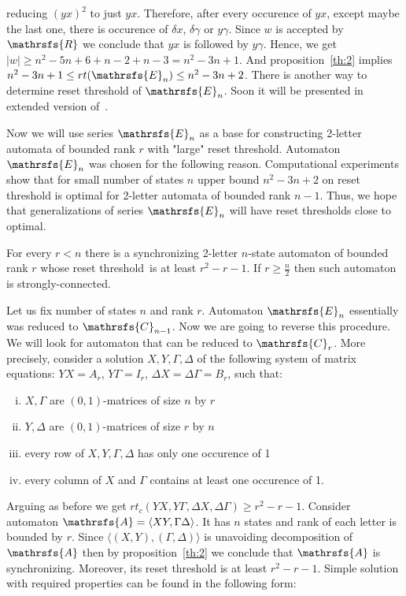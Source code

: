 \documentclass[11pt]{llncs}
\newcommand{\rl}{reset threshold}
\newcommand{\A}{\mathrsfs{A}}
\newcommand{\R}{\mathrsfs{R}}
\newcommand{\G}{\Gamma}
\newcommand{\D}{\Delta}
\newcommand{\g}{\gamma}
\newcommand{\dl}{\delta}
\newcommand{\rt}{rt}
\newcommand{\rtc}{rt_{c}}
\begin{document}
reducing $(yx)^2$ to just $yx$. Therefore, after every occurence of $yx$, except maybe the last one, there is occurence 
of $\dl x$, $\dl \g$ or $y \g$. Since $w$ is accepted by $\R$ we conclude that $yx$ is followed by $y\g$.
Hence, we get $|w| \geq n^2 - 5n + 6 + n - 2 + n - 3 = n^2 -3n + 1$.
And proposition~\ref{th:2} implies $n^2 -3n + 1 \leq \rt(\mathrsfs{E}_n) \leq n^2 -3n + 2$. 
There is another way to determine reset threshold of $\mathrsfs{E}_n$. Soon it will be presented in
extended version of~\cite{AGV}.

Now we will use series $\mathrsfs{E}_n$ as a base for constructing 2-letter automata of bounded
rank $r$ with "large" reset threshold. Automaton $\mathrsfs{E}_n$ was chosen for the following reason.
Computational experiments show that for small number of states $n$ upper bound $n^2 -3n +2$ on reset threshold is optimal
for 2-letter automata of bounded rank $n - 1$.
Thus, we hope that generalizations of series $\mathrsfs{E}_n$ will have reset thresholds close to optimal.

\begin{proposition}
For every $r < n$ there is a synchronizing 2-letter $n$-state automaton of bounded rank $r$ whose \rl\ is at least 
$r^2 -r - 1$. If $r \geq \frac{n}{2}$ then such automaton is strongly-connected.
\end{proposition}

Let us fix number of states $n$ and rank $r$. Automaton $\mathrsfs{E}_n$ essentially was reduced to $\mathrsfs{C}_{n - 1}$.
Now we are going to reverse this procedure. We will look for automaton that can be reduced to $\mathrsfs{C}_r$.
More precisely, consider a solution $X,Y,\G,\D$ of the following system of matrix equations:
$YX = A_{r}$, $Y\G = I_{r}$, $\D X = \D \G = B_{r}$, such that:
\begin{enumerate}[(i)]
\item $X,\G$ are $(0,1)$-matrices of size $n$ by $r$
\item $Y,\D$ are $(0,1)$-matrices of size $r$ by $n$
\item every row of $X, Y, \G, \D$ has only one occurence of 1
\item every column of $X$ and $\G$ contains at least one occurence of 1.
\end{enumerate}
Arguing as before we get $\rtc(YX, Y\G, \D X, \D \G) \geq r^2 - r - 1$.
Consider automaton $\A = \langle XY, \G\D \rangle$. It has $n$ states and rank of each letter is bounded by $r$.
Since $\langle (X,Y), (\G, \D) \rangle$ is unavoiding decomposition of $\A$ then by proposition~\ref{th:2} we 
conclude that $\A$ is synchronizing.
Moreover, its reset threshold is at least $r^2 - r - 1$.
Simple solution with required properties can be found in the following form:
\end{document}
